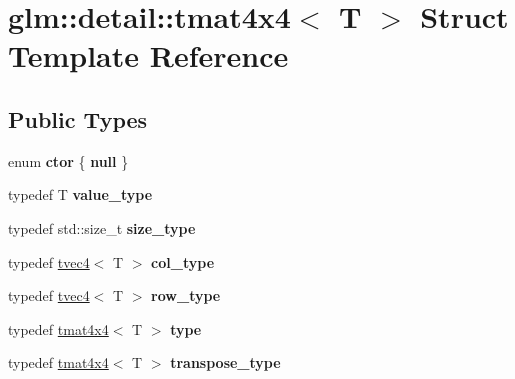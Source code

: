 \hypertarget{structglm_1_1detail_1_1tmat4x4}{\section{glm\-:\-:detail\-:\-:tmat4x4$<$ T $>$ Struct Template Reference}
\label{structglm_1_1detail_1_1tmat4x4}
}
\subsection*{Public Types}
\begin{DoxyCompactItemize}
\item 
enum {\bfseries ctor} \{ {\bfseries null}
 \}
\item 
\hypertarget{structglm_1_1detail_1_1tmat4x4_a1cecf5e761361c7059e46b24e29cd2f1}{typedef T {\bfseries value\-\_\-type}}\label{structglm_1_1detail_1_1tmat4x4_a1cecf5e761361c7059e46b24e29cd2f1}

\item 
\hypertarget{structglm_1_1detail_1_1tmat4x4_a8f1b0a2fa96bf7e719f7e2c11c656dd1}{typedef std\-::size\-\_\-t {\bfseries size\-\_\-type}}\label{structglm_1_1detail_1_1tmat4x4_a8f1b0a2fa96bf7e719f7e2c11c656dd1}

\item 
\hypertarget{structglm_1_1detail_1_1tmat4x4_a5dc30f4b00010b33f6b95e6c558dff68}{typedef \hyperlink{structglm_1_1detail_1_1tvec4}{tvec4}$<$ T $>$ {\bfseries col\-\_\-type}}\label{structglm_1_1detail_1_1tmat4x4_a5dc30f4b00010b33f6b95e6c558dff68}

\item 
\hypertarget{structglm_1_1detail_1_1tmat4x4_a9c0a194b62da2323d9a79bb40b4337f1}{typedef \hyperlink{structglm_1_1detail_1_1tvec4}{tvec4}$<$ T $>$ {\bfseries row\-\_\-type}}\label{structglm_1_1detail_1_1tmat4x4_a9c0a194b62da2323d9a79bb40b4337f1}

\item 
\hypertarget{structglm_1_1detail_1_1tmat4x4_ae20b8893d19f3dc56b587a2059d1769c}{typedef \hyperlink{structglm_1_1detail_1_1tmat4x4}{tmat4x4}$<$ T $>$ {\bfseries type}}\label{structglm_1_1detail_1_1tmat4x4_ae20b8893d19f3dc56b587a2059d1769c}

\item 
\hypertarget{structglm_1_1detail_1_1tmat4x4_a29c20e8f3f3ff49045950167027bfa0e}{typedef \hyperlink{structglm_1_1detail_1_1tmat4x4}{tmat4x4}$<$ T $>$ {\bfseries transpose\-\_\-type}}\label{structglm_1_1detail_1_1tmat4x4_a29c20e8f3f3ff49045950167027bfa0e}

\end{DoxyCompactItemize}
